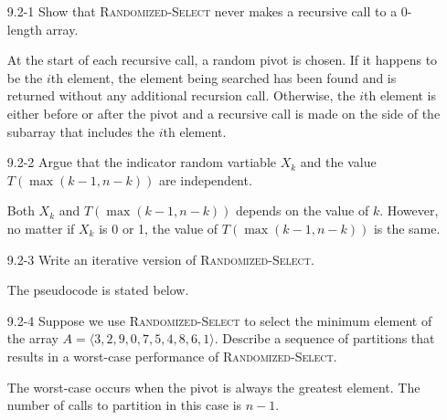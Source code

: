 \begin{enumerate}

\item[9.2-1]{Show that \textsc{Randomized-Select} never makes a recursive call
to a 0-length array.}

\begin{framed}
At the start of each recursive call, a random pivot is chosen. If it happens to
be the $i$th element, the element being searched has been found and is returned
without any additional recursion call. Otherwise, the $i$th element is either
before or after the pivot and a recursive call is made on the side of the
subarray that includes the $i$th element.
\end{framed}

\item[9.2-2]{Argue that the indicator random vartiable $X_k$ and the value
$T(\max(k - 1, n - k))$ are independent.}

\begin{framed}
Both $X_k$ and $T(\max(k - 1, n - k))$ depends on the value of $k$. However, no
matter if $X_k$ is 0 or 1, the value of $T(\max(k - 1, n - k))$ is the same.
\end{framed}

\item[9.2-3]{Write an iterative version of \textsc{Randomized-Select}.}

\begin{framed}
The pseudocode is stated below.

\begin{algorithm}[H]
\SetAlgoNoEnd\DontPrintSemicolon
\BlankLine
{}
\nonl{}
\end{algorithm}
\end{framed}

\item[9.2-4]{Suppose we use \textsc{Randomized-Select} to select the minimum
element of the array $A = \langle 3, 2, 9, 0, 7, 5, 4, 8, 6, 1 \rangle$.
Describe a sequence of partitions that results in a worst-case performance of
\textsc{Randomized-Select}.}

\begin{framed}
The worst-case occurs when the pivot is always the greatest element. The number
of calls to partition in this case is $n - 1$.
\end{framed}

\end{enumerate}

